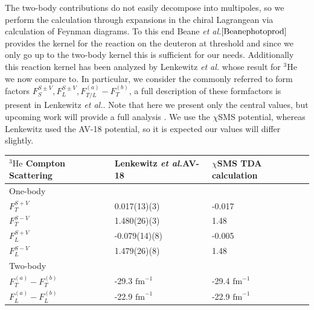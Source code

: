 \documentclass[a4paper,11pt]{article}
\newcommand{\etal}{\textit{et al.}}
\newcommand{\HeT}{{}^{3} \mathrm{He}}
\newcommand{\fmin}{\mathrm{fm}^{-1}}
\begin{document}
The two-body contributions do not easily decompose into multipoles, so we perform the calculation through expansions
in the chiral Lagrangean via calculation of Feynman diagrams.
To this end Beane \etal $\cite{Beanephotoprod}$ provides the kernel for the reaction on the deuteron at threshold
and since we only go up to the two-body kernel this is sufficient for our needs.
Additionally this reaction kernel has been analyzed by
Lenkewitz \etal \cite{L2011, L2013} whose result for $\HeT$ we now compare to.
In particular, we consider the commonly referred to form factors 
$F_S^{S\pm V}, F_L^{S\pm V}, F_{T/L}^{(a)}-F_T^{(b)}$, a full description of these formfactors is present in Lenkewitz \etal \cite{L2011}.
Note that here we present only the central values, but upcoming work will provide a full analysis \cite{upcomingPionPhoto}.
We use the $\chi$SMS potential, whereas Lenkewitz used the AV-18 potential, so it is expected our values will differ slightly.
\begin{table}[ht]
\centering
\begin{tabular}{|l|l|l|}
\hline
${}^3\mathrm{He}$ Compton Scattering    & Lenkewitz \etal AV-18 \cite{L2011} & $\chi$SMS TDA calculation\cite{upcomingPionPhoto} \\ \hline\hline
One-body              &                &                           \\ \hline
$F_T^{S+V}$           & 0.017(13)(3)   & -0.017                    \\
$F_T^{S-V}$           & 1.480(26)(3)   & 1.48                      \\
$F_L^{S+V}$           & -0.079(14)(8)  & -0.005                    \\
$F_L^{S-V}$           & 1.479(26)(8)   & 1.48                      \\ \cline{1-1}\hline\hline
Two-body              &                &                           \\ \hline
$F_T^{(a)}-F_T^{(b)}$ & -29.3  $\fmin$        & -29.4   $\fmin$           \\
$F_L^{(a)}-F_L^{(b)}$ & -22.9   $\fmin$       & -22.9   $\fmin$                  \\ \hline
\end{tabular}
\end{table}
\end{document}
